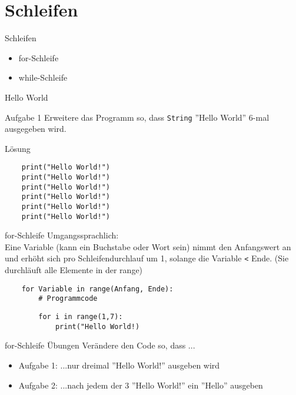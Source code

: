 \section{Schleifen}

\begin{frame}{Schleifen}
\begin{itemize}
	\item for-Schleife
	\item while-Schleife
\end{itemize}
\end{frame}


\begin{frame}[fragile]{Hello World}
\begin{block}{Aufgabe 1}
	Erweitere das Programm so, dass  \texttt{String} ''Hello World''
	6-mal ausgegeben wird.
\end{block}
\pause{}
\begin{exampleblock}{Lösung}
	\begin{lstlisting}
	print("Hello World!")
	print("Hello World!")
	print("Hello World!")
	print("Hello World!")
	print("Hello World!")
	print("Hello World!")
	\end{lstlisting}
\end{exampleblock}
\end{frame}


\begin{frame}[fragile]{for-Schleife}
	Umgangssprachlich: \\
	Eine Variable (kann ein Buchstabe oder Wort sein) nimmt den Anfangswert an und erhöht sich pro Schleifendurchlauf um 1, solange die Variable \texttt{<} Ende. (Sie durchläuft alle Elemente in der range)
	
	\begin{lstlisting}
	for Variable in range(Anfang, Ende):
		# Programmcode
	\end{lstlisting}
	
	\begin{lstlisting}
		for i in range(1,7):
			print("Hello World!)
	\end{lstlisting}	
\end{frame}

\begin{frame}[fragile]{for-Schleife Übungen}
Verändere den Code so, dass ...
\begin{itemize}
\item Aufgabe 1: ...nur dreimal ''Hello World!'' ausgeben wird\\
\item Aufgabe 2: ...nach jedem der 3 ''Hello World!'' ein ''Hello'' ausgeben
\end{itemize}
\end{frame}


